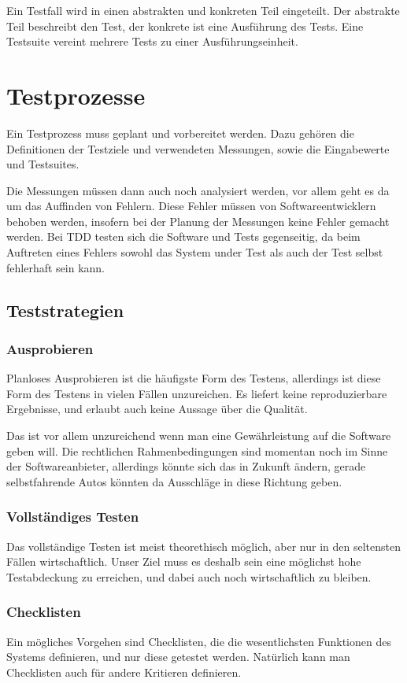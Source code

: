 Ein Testfall wird in einen abstrakten und konkreten Teil eingeteilt. Der abstrakte Teil beschreibt den Test, der konkrete ist eine Ausführung des Tests. Eine Testsuite vereint mehrere Tests zu einer Ausführungseinheit.

\section{Testprozesse}
Ein Testprozess muss geplant und vorbereitet werden. Dazu gehören die Definitionen der Testziele und verwendeten Messungen, sowie die Eingabewerte und Testsuites.

Die Messungen müssen dann auch noch analysiert werden, vor allem geht es da um das Auffinden von Fehlern. Diese Fehler müssen von Softwareentwicklern behoben werden, insofern bei der Planung der Messungen keine Fehler gemacht werden. Bei TDD testen sich die Software und Tests gegenseitig, da beim Auftreten eines Fehlers sowohl das System under Test als auch der Test selbst fehlerhaft sein kann.

\subsection{Teststrategien}
\subsubsection{Ausprobieren}
Planloses Ausprobieren ist die häufigste Form des Testens, allerdings ist diese Form des Testens in vielen Fällen unzureichen. Es liefert keine reproduzierbare Ergebnisse, und erlaubt auch keine Aussage über die Qualität.

Das ist vor allem unzureichend wenn man eine Gewährleistung auf die Software geben will. Die rechtlichen Rahmenbedingungen sind momentan noch im Sinne der Softwareanbieter, allerdings könnte sich das in Zukunft ändern, gerade selbstfahrende Autos könnten da Ausschläge in diese Richtung geben.

\subsubsection{Vollständiges Testen}
Das vollständige Testen ist meist theorethisch möglich, aber nur in den seltensten Fällen wirtschaftlich. Unser Ziel muss es deshalb sein eine möglichst hohe Testabdeckung zu erreichen, und dabei auch noch wirtschaftlich zu bleiben.

\subsubsection{Checklisten}
Ein mögliches Vorgehen sind Checklisten, die die wesentlichsten Funktionen des Systems definieren, und nur diese getestet werden. Natürlich kann man Checklisten auch für andere Kritieren definieren.

